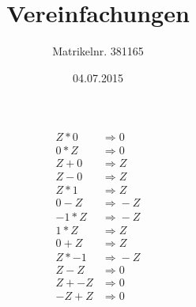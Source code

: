 \documentclass[a4paper,11pt]{scrartcl}
\author{Matrikelnr. 381165}
\title{Vereinfachungen}
\date{04.07.2015}
\newcommand{\ra}{&\Rightarrow{}}
\newcommand{\add}[3]{#1 + #2 \ra #3 \\}
\newcommand{\sub}[3]{#1 - #2 \ra #3 \\}
\newcommand{\mul}[3]{#1 \ast #2 \ra #3 \\}
\begin{document}
\maketitle

\begin{align*}
    \mul{Z}{0}{0}  %
    \mul{0}{Z}{0}  %
    \add{Z}{0}{Z}  %
    \sub{Z}{0}{Z}  %
    \mul{Z}{1}{Z}  %
    \sub{0}{Z}{-Z}  %
    \mul{-1}{Z}{-Z}  %
    \mul{1}{Z}{Z}  %
    \add{0}{Z}{Z}  %
    \mul{Z}{-1}{-Z}  %
    \sub{Z}{Z}{0}  %
    \add{Z}{-Z}{0}  %
    \add{-Z}{Z}{0}  %
\end{align*}
\end{document}
